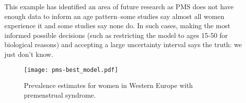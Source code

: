 This example has identified an area of future research as PMS does not have enough
data to inform an age pattern--some studies say almost all women experience
it and some studies say none do.  In such cases, making the most informed
possible decisions (such as restricting the model to ages 15-50 for biological
reasons) and accepting a large uncertainty interval says the truth: we just don't know.

    \begin{figure}
        \begin{center}
            \texttt{[image: pms-best\_model.pdf]}
        \end{center}
        \caption{Prevalence estimates for women
          in Western Europe with premenstrual syndrome.}
        \label{fig:app-pms best}
    \end{figure}









